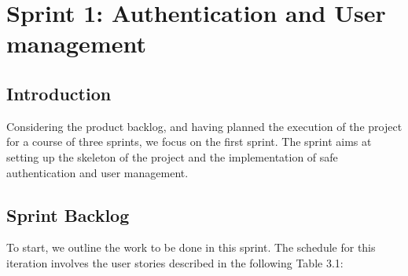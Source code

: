 
\chapter{Sprint 1: Authentication and User management}

\section*{Introduction}
Considering the product backlog, and having planned the execution of the project for a course of three sprints, we focus on the first sprint. The sprint aims at setting up the skeleton of the project and the implementation of safe authentication and user management.\\
\section{Sprint Backlog}
To start, we outline the work to be done in this sprint. The schedule for this iteration
involves the user stories described in the following Table 3.1:

